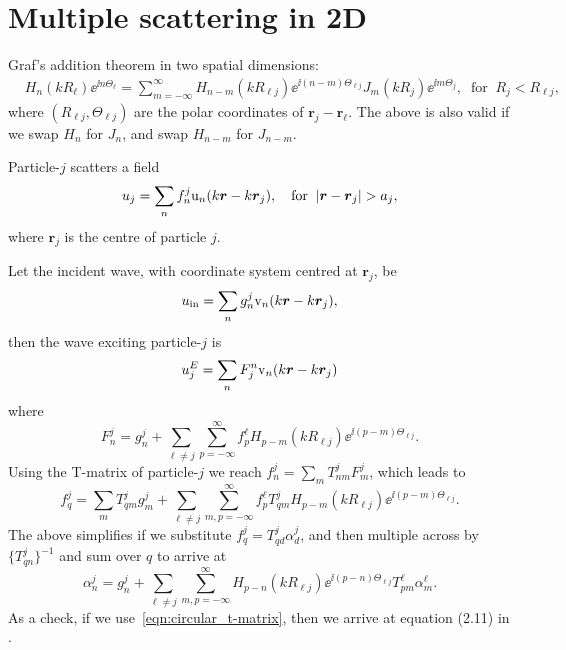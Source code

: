 \documentclass[ 12pt, a4paper]{article}
\renewcommand{\vec}[1]{\boldsymbol{#1}}
\begin{document}
\section{Multiple scattering in 2D}

Graf's addition theorem in two spatial dimensions:
\begin{align}
  & H_n(k R_\ell)\ee^{\ii n \Theta_\ell} =
  \sum_{m=-\infty}^\infty H_{n-m}(k R_{\ell j})\ee^{\ii(n-m)\Theta_{\ell j}} J_{m}(k R_j)\ee^{\ii m \Theta_j}, \;\;\text{for}\;\; R_j < R_{\ell j},
\label{eqn:Graf}
\end{align}
where $(R_{\ell j},\Theta_{\ell j})$ are the polar coordinates of $\vec r_j - \vec r_\ell$. The above is also valid if we swap $H_n$  for $J_n$, and swap $H_{n-m}$ for $J_{n-m}$.

Particle-$j$ scatters a field
\begin{equation}
  \label{eqn:outwaves}
  u_j = \sum_{n} f_n^j \mathrm u_{n}(k\rv - k \rv_j), \quad \text{for} \;\; |\rv - \rv_j| > a_j,
\end{equation}
where $\vec r_j$ is the centre of particle $j$.

Let the incident wave, with coordinate system centred at $\vec r_j$, be
\begin{equation}
  \label{eqn:incident}
  \ui = \sum_{n} g_n^j \mathrm v_{n}(k\rv - k \rv_j),
\end{equation}
then the wave exciting particle-$j$ is
\begin{equation}
  \label{eqn:exciter}
  u_j^E = \sum_{n} F^n_j \mathrm v_{n}(k\rv - k \rv_j)
\end{equation}
where
\begin{equation}
  F_n^j = g_n^j + \sum_{\ell\not = j} \sum_{p=-\infty}^\infty f_p^\ell H_{p-m}(k R_{\ell j})\ee^{\ii(p-m)\Theta_{\ell j}}.
\end{equation}
Using the T-matrix of particle-$j$ we reach $f_n^j = \sum_m T_{nm}^j F_m^j$, which leads to
\begin{equation}
f_q^j  = \sum_{m} T_{qm}^j g_m^j + \sum_{\ell\not = j} \sum_{m,p=-\infty}^\infty f_p^\ell T_{qm}^j H_{p-m}(k R_{\ell j})\ee^{\ii(p-m)\Theta_{\ell j}}.
\label{eqn:As}
\end{equation}
The above simplifies if we substitute $f_q^j =  T_{qd}^j \alpha_d^j$, and then multiple across by $\{T_{qn}^j\}^{-1}$ and sum over $q$ to arrive at
\begin{equation}
\alpha_n^j = g_n^j + \sum_{\ell\not = j} \sum_{m,p=-\infty}^\infty  H_{p-n}(k R_{\ell j})\ee^{\ii(p - n)\Theta_{\ell j}} T_{pm}^\ell \alpha_m^\ell.
\label{eqn:As}
\end{equation}
As a check, if we use~\eqref{eqn:circular_t-matrix}, then we arrive at equation (2.11) in \cite{gower_reflection_2017}.
\end{document}
